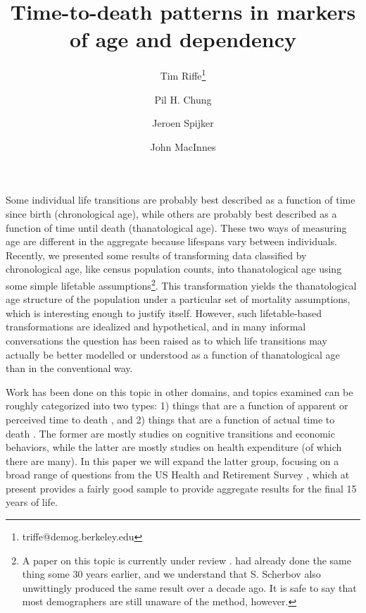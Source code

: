 \documentclass{article}
\begin{document}
\title{Time-to-death patterns in markers of age and dependency}

\author[1]{Tim Riffe\thanks{triffe@demog.berkeley.edu}}
\author[1]{Pil H. Chung}
\author[2,3]{Jeroen Spijker}
\author[4]{John MacInnes}

\maketitle

Some individual life transitions are probably best described as a function of
time since birth (chronological age), while others are probably best described as a
function of time until death (thanatological age). These two ways of
measuring age are different in the aggregate because lifespans vary between
individuals.
Recently, we presented some results of transforming
data classified by chronological age, like census population counts, into
thanatological age using some simple lifetable
assumptions\footnote{A paper on this topic is
currently under review \citep{riffe2014paaposter}. \citet{brouard1986structure,
brouard1989mouvements} had already done the same thing some 30 years earlier, and we understand that
S. Scherbov also unwittingly produced the same result over a decade ago. It is
safe to say that most demographers are still unaware of the method, however.}.
This transformation yields the thanatological age structure of the population
under a particular set of mortality assumptions, which is interesting enough to
justify itself.
However, such lifetable-based transformations are idealized and hypothetical, and in many informal
conversations the question has been raised as to which life transitions
may actually be better modelled or understood as a function of thanatological
age than in the conventional way.

Work has been done on this topic in other domains, and
topics examined can be roughly categorized into two types: 1) things that are a
function of apparent or perceived time to death
\citep{carstensen2006influence,gan2004subjective,salm2010subjective,van2010living}, and 2) things that are a function of actual time to death
\citep{miller2001increasing,seshamani2004longitudinal}. The former are mostly
studies on cognitive transitions and economic behaviors, while the latter are
mostly studies on health expenditure (of which there are many). In this paper we
will expand the latter group, focusing on a broad range of questions from the US
Health and Retirement Survey \citep{HRS}, which at present provides a fairly
good sample to provide aggregate results for the final 15 years of life.
\end{document}
